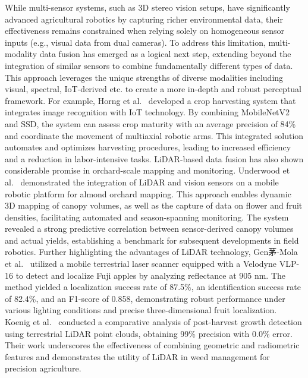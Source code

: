 \documentclass[a4paper,fleqn]{cas-dc}
\begin{document}
While multi-sensor systems, such as 3D stereo vision setups, have significantly advanced agricultural robotics by capturing richer environmental data, their effectiveness remains constrained when relying solely on homogeneous sensor inputs (e.g., visual data from dual cameras). To address this limitation, multi-modality data fusion has emerged as a logical next step, extending beyond the integration of similar sensors to combine fundamentally different types of data. This approach leverages the unique strengths of diverse modalities including visual, spectral, IoT-derived etc. to create a more in-depth and robust perceptual framework.
For example, Horng et al.~\cite{horng2019smart} developed a crop harvesting system that integrates image recognition with IoT technology. By combining MobileNetV2 and SSD, the system can assess crop maturity with an average precision of 84\% and coordinate the movement of multiaxial robotic arms. This integrated solution automates and optimizes harvesting procedures, leading to increased efficiency and a reduction in labor-intensive tasks.
LiDAR-based data fusion has also shown considerable promise in orchard-scale mapping and monitoring. Underwood et al.~\cite{underwood2016mapping} demonstrated the integration of LiDAR and vision sensors on a mobile robotic platform for almond orchard mapping. This approach enables dynamic 3D mapping of canopy volumes, as well as the capture of data on flower and fruit densities, facilitating automated and season-spanning monitoring. The system revealed a strong predictive correlation between sensor-derived canopy volumes and actual yields, establishing a benchmark for subsequent developments in field robotics.
Further highlighting the advantages of LiDAR technology, Gen茅-Mola et al.~\cite{gene2019fruit} utilized a mobile terrestrial laser scanner equipped with a Velodyne VLP-16 to detect and localize Fuji apples by analyzing reflectance at 905 nm. The method yielded a localization success rate of 87.5\%, an identification success rate of 82.4\%, and an F1-score of 0.858, demonstrating robust performance under various lighting conditions and precise three-dimensional fruit localization. Koenig et al.~\cite{koenig2015comparative} conducted a comparative analysis of post-harvest growth detection using terrestrial LiDAR point clouds, obtaining 99\% precision with 0.0\% error. Their work underscores the effectiveness of combining geometric and radiometric features and demonstrates the utility of LiDAR in weed management for precision agriculture.
\end{document}
